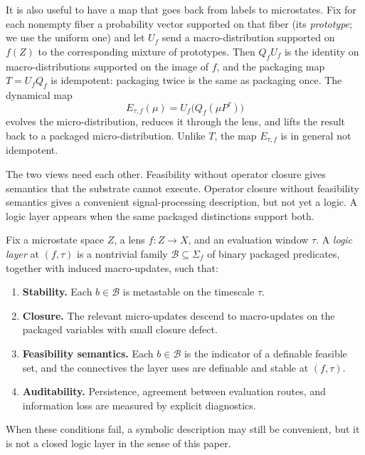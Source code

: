 It is also useful to have a map that goes back from labels to microstates. Fix for each nonempty fiber a probability vector supported on that fiber (its \emph{prototype}; we use the uniform one) and let \(U_f\) send a macro-distribution supported on \(f(Z)\) to the corresponding mixture of prototypes. Then \(Q_f U_f\) is the identity on macro-distributions supported on the image of \(f\), and the packaging map \(T=U_f Q_f\) is idempotent: packaging twice is the same as packaging once. The dynamical map
\[
E_{\tau,f}(\mu) = U_f\bigl(Q_f(\mu P^\tau)\bigr)
\]
evolves the micro-distribution, reduces it through the lens, and lifts the result back to a packaged micro-distribution. Unlike \(T\), the map \(E_{\tau,f}\) is in general not idempotent.

The two views need each other. Feasibility without operator closure gives semantics that the substrate cannot execute. Operator closure without feasibility semantics gives a convenient signal-processing description, but not yet a logic. A logic layer appears when the same packaged distinctions support both.

\begin{definition}
\label{def:logic-layer}
Fix a microstate space \(Z\), a lens \(f : Z \to X\), and an evaluation window \(\tau\). A \emph{logic layer} at \((f,\tau)\) is a nontrivial family \(\mathcal{B} \subseteq \Sigma_f\) of binary packaged predicates, together with induced macro-updates, such that:
\begin{enumerate}
    \item \textbf{Stability.} Each \(b \in \mathcal{B}\) is metastable on the timescale \(\tau\).
    \item \textbf{Closure.} The relevant micro-updates descend to macro-updates on the packaged variables with small closure defect.
    \item \textbf{Feasibility semantics.} Each \(b \in \mathcal{B}\) is the indicator of a definable feasible set, and the connectives the layer uses are definable and stable at \((f,\tau)\).
    \item \textbf{Auditability.} Persistence, agreement between evaluation routes, and information loss are measured by explicit diagnostics.
\end{enumerate}
When these conditions fail, a symbolic description may still be convenient, but it is not a closed logic layer in the sense of this paper.
\end{definition}

